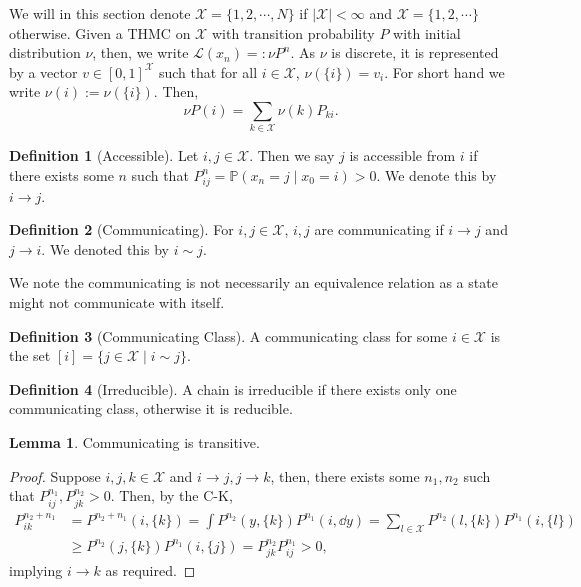\documentclass[]{article}
\theoremstyle{definition}
\theoremstyle{definition}
\newtheorem{definition}{Definition}[section]
\newtheorem{lemma}{Lemma}[section]
\begin{document}
We will in this section denote \(\mathcal{X} = \{1, 2, \cdots, N\}\) if \(|\mathcal{X}| < \infty\)
and \(\mathcal{X} = \{1, 2, \cdots\}\) otherwise. Given a THMC on \(\mathcal{X}\) with 
transition probability \(P\) with initial distribution \(\nu\), then, we write
\(\mathcal{L}(x_n) =: \nu P^n\). As \(\nu\) is discrete, it is represented by a vector 
\(v \in [0, 1]^{\mathcal{X}}\) such that for all \(i \in \mathcal{X}\), \(\nu(\{i\}) = v_i\).
For short hand we write \(\nu(i) := \nu(\{i\})\). Then, 
\[\nu P(i) = \sum_{k \in \mathcal{X}} \nu(k)P_{ki}.\]

\begin{definition}[Accessible]
  Let \(i, j \in \mathcal{X}\). Then we say \(j\) is accessible from \(i\) if there 
  exists some \(n\) such that \(P^n_{ij} = \mathbb{P}(x_n = j \mid x_0 = i) > 0\). 
  We denote this by \(i \longrightarrow j\).
\end{definition}

\begin{definition}[Communicating]
  For \(i, j \in \mathcal{X}\), \(i, j\) are communicating if \(i \longrightarrow j\) 
  and \(j \longrightarrow i\). We denoted this by \(i \sim j\).
\end{definition}

We note the communicating is not necessarily an equivalence relation as a state 
might not communicate with itself.

\begin{definition}[Communicating Class]
  A communicating class for some \(i \in \mathcal{X}\) is the set 
  \([i] = \{j \in \mathcal{X} \mid i \sim j\}\).
\end{definition}

\begin{definition}[Irreducible]
  A chain is irreducible if there exists only one communicating class, otherwise 
  it is reducible.
\end{definition}

\begin{lemma}
  Communicating is transitive.
\end{lemma}
\begin{proof}
  Suppose \(i, j, k \in \mathcal{X}\) and \(i \longrightarrow j, j \longrightarrow k\),
  then, there exists some \(n_1, n_2\) such that \(P^{n_1}_{ij}, P^{n_2}_{jk} > 0\). 
  Then, by the C-K,
  \[\begin{split}
    P^{n_2 + n_1}_{ik} & = P^{n_2 + n_1}(i, \{k\}) = \int P^{n_2}(y, \{k\}) P^{n_1}(i, \dd y) 
      = \sum_{l \in \mathcal{X}} P^{n_2}(l, \{k\}) P^{n_1}(i, \{l\})\\
      & \ge P^{n_2}(j, \{k\}) P^{n_1}(i, \{j\}) = P^{n_2}_{jk}P^{n_1}_{ij} > 0,
  \end{split}\]
  implying \(i \longrightarrow k\) as required.
\end{proof}
\end{document}

